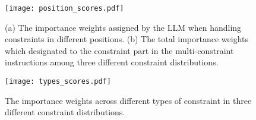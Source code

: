 \begin{figure*}[t] 
    \centering
        \texttt{[image: position\_scores.pdf]}
    \caption{(a) The importance weights assigned by the LLM when handling constraints in different positions. (b) The total importance weights which designated to the constraint part in the multi-constraint instructions among three different constraint distributions.}
    \label{fig:position_score}
\end{figure*}


\begin{figure}[t] 
    \centering
        \texttt{[image: types\_scores.pdf]}
    \caption{The importance weights across different types of constraint in three different constraint distributions.}
    \label{fig:type_score}
\end{figure}







